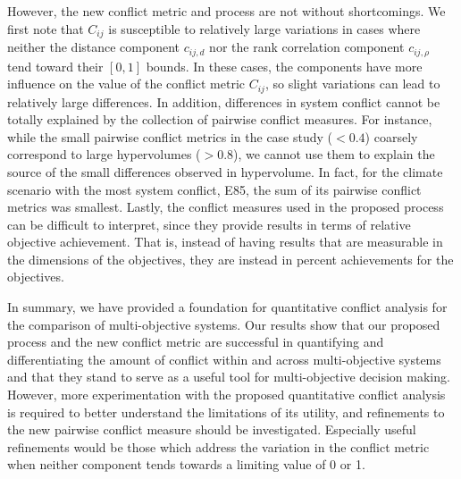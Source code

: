 However, the new conflict metric and process are not without shortcomings. We first note that $C_{ij}$ is susceptible to relatively large variations in cases where neither the distance component $c_{ij,d}$ nor the rank correlation component $c_{ij,\rho}$ tend toward their $[0,1]$ bounds. In these cases, the components have more influence on the value of the conflict metric $C_{ij}$, so slight variations can lead to relatively large differences. In addition, differences in system conflict cannot be totally explained by the collection of pairwise conflict measures. For instance, while the small pairwise conflict metrics in the case study ($< 0.4$) coarsely correspond to large hypervolumes ($> 0.8$), we cannot use them to explain the source of the small differences observed in hypervolume. In fact, for the climate scenario with the most system conflict, E85, the sum of its pairwise conflict metrics was smallest. Lastly, the conflict measures used in the proposed process can be difficult to interpret, since they provide results in terms of relative objective achievement. That is, instead of having results that are measurable in the dimensions of the objectives, they are instead in percent achievements for the objectives.

In summary, we have provided a foundation for quantitative conflict analysis for the comparison of multi-objective systems. Our results show that our proposed process and the new conflict metric are successful in quantifying and differentiating the amount of conflict within and across multi-objective
systems and that they stand to serve as a useful tool for multi-objective decision making. However, more experimentation with the proposed quantitative conflict analysis is required to better understand the limitations of its utility, and refinements to the new pairwise conflict measure should be investigated. Especially useful refinements would be those which address the variation in the conflict metric when neither component tends towards a limiting value of 0 or 1.